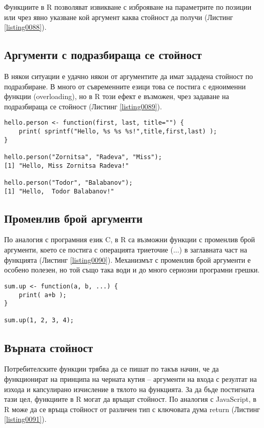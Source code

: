 Функциите в R позволяват извикване с изброяване на параметрите по позиции или чрез явно указване кой аргумент каква стойност да получи (Листинг \ref{listing0088}).

\subsection{Аргументи с подразбираща се стойност}

В някои ситуации е удачно някои от аргументите да имат зададена стойност по подразбиране. В много от съвременните езици това се постига с едноименни функции (overloading), но в R този ефект е възможен, чрез задаване на подразбираща се стойност (Листинг \ref{listing0089}).

\begin{lstlisting}[caption=Извикване на функция с подразбиращи се аргументи, label=listing0089]
hello.person <- function(first, last, title="") {
	print( sprintf("Hello, %s %s %s!",title,first,last) );
}

hello.person("Zornitsa", "Radeva", "Miss");
[1] "Hello, Miss Zornitsa Radeva!"

hello.person("Todor", "Balabanov");
[1] "Hello,  Todor Balabanov!"
\end{lstlisting}

\subsection{Променлив брой аргументи}

По аналогия с програмния език C, в R са възможни функции с променлив брой аргументи, което се постига с операцията триеточие (...) в заглавната част на функцията (Листинг \ref{listing0090}). Механизмът с променлив брой аргументи е особено полезен, но той също така води и до много сериозни програмни грешки.

\begin{lstlisting}[caption=Функция с променлив брой аргументи, label=listing0090]
sum.up <- function(a, b, ...) {
	print( a+b );
}

sum.up(1, 2, 3, 4);
\end{lstlisting}

\subsection{Върната стойност}

Потребителските функции трябва да се пишат по такъв начин, че да функционират на принципа на черната кутия – аргументи на входа с резултат на изхода и капсулирано изчисление в тялото на функцията. За да бъде постигната тази цел, функциите в R могат да връщат стойност. По аналогия с JavaScript, в R може да се връща стойност от различен тип с ключовата дума return (Листинг \ref{listing0091}).

